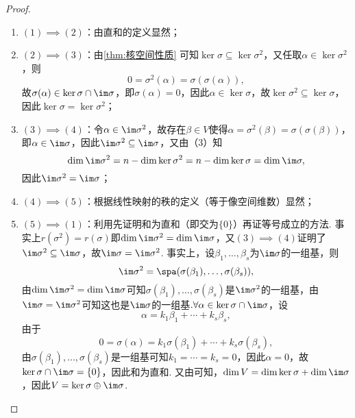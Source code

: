 \begin{enumerate}
          \begin{proof}
              \begin{enumerate}
                  \item $(1)\implies(2)$：由直和的定义显然；

                  \item $(2)\implies(3)$：由\autoref{thm:核空间性质} 可知$\ker\sigma\subseteq\ker\sigma^2$，又任取$\alpha\in\ker\sigma^2$，则
                        \[0=\sigma^2(\alpha)=\sigma(\sigma(\alpha)),\]故$\sigma(\alpha)\in\ker\sigma\cap\im\sigma$，即$\sigma(\alpha)=0$，因此$\alpha\in\ker\sigma$，故$\ker\sigma^2\subseteq\ker\sigma$，因此$\ker\sigma=\ker\sigma^2$；

                  \item $(3)\implies(4)$：令$\alpha\in\im\sigma^2$，故存在$\beta\in V$使得$\alpha=\sigma^2(\beta)=\sigma(\sigma(\beta))$，即$\alpha\in\im\sigma$，因此$\im\sigma^2\subseteq\im\sigma$，又由（3）知
                        \[\dim\im\sigma^2=n-\dim\ker\sigma^2=n-\dim\ker\sigma=\dim\im\sigma,\]
                        因此$\im\sigma^2=\im\sigma$；

                  \item $(4)\implies(5)$：根据线性映射的秩的定义（等于像空间维数）显然；

                  \item $(5)\implies(1)$：利用先证明和为直和（即交为$\{0\}$）再证等号成立的方法. 事实上$r(\sigma^2)=r(\sigma)$即$\dim\im\sigma^2=\dim\im\sigma$，又$(3)\implies(4)$证明了$\im\sigma^2\subseteq\im\sigma$，故$\im \sigma=\im \sigma^2$. 事实上，设$\beta_1,\ldots,\beta_s$为$\im\sigma$的一组基，则
                        \[\im\sigma^2=\spa(\sigma(\beta_1),\ldots,\sigma(\beta_s)),\]
                        由$\dim\im\sigma^2=\dim\im\sigma$可知$\sigma(\beta_1),\ldots,\sigma(\beta_s)$是$\im\sigma^2$的一组基，由$\im \sigma=\im \sigma^2$可知这也是$\im\sigma$的一组基$. \forall\alpha\in\ker\sigma\cap\im\sigma$，设
                        \[\alpha=k_1\beta_1+\cdots+k_s\beta_s,\]
                        由于
                        \[0=\sigma(\alpha)=k_1\sigma(\beta_1)+\cdots+k_s\sigma(\beta_s),\]
                        由$\sigma(\beta_1),\ldots,\sigma(\beta_s)$是一组基可知$k_1=\cdots=k_s=0$，因此$\alpha=0$，故$\ker\sigma\cap\im\sigma=\{0\}$，因此和为直和. 又由可知，$\dim V=\dim\ker\sigma+\dim\im \sigma$，因此$V=\ker\sigma\oplus\im \sigma$.
              \end{enumerate}
          \end{proof}


\end{enumerate}

